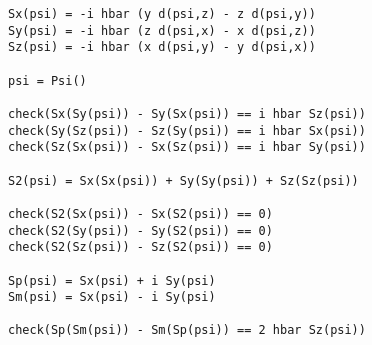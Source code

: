 \newpage
{}

{\footnotesize\begin{verbatim}
Sx(psi) = -i hbar (y d(psi,z) - z d(psi,y))
Sy(psi) = -i hbar (z d(psi,x) - x d(psi,z))
Sz(psi) = -i hbar (x d(psi,y) - y d(psi,x))

psi = Psi()

check(Sx(Sy(psi)) - Sy(Sx(psi)) == i hbar Sz(psi))
check(Sy(Sz(psi)) - Sz(Sy(psi)) == i hbar Sx(psi))
check(Sz(Sx(psi)) - Sx(Sz(psi)) == i hbar Sy(psi))

S2(psi) = Sx(Sx(psi)) + Sy(Sy(psi)) + Sz(Sz(psi))

check(S2(Sx(psi)) - Sx(S2(psi)) == 0)
check(S2(Sy(psi)) - Sy(S2(psi)) == 0)
check(S2(Sz(psi)) - Sz(S2(psi)) == 0)

Sp(psi) = Sx(psi) + i Sy(psi)
Sm(psi) = Sx(psi) - i Sy(psi)

check(Sp(Sm(psi)) - Sm(Sp(psi)) == 2 hbar Sz(psi))
\end{verbatim}}


